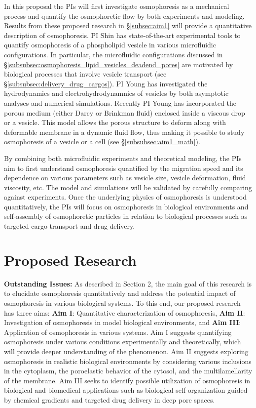 \documentclass[11pt]{article}
\begin{document}
In this proposal the PIs will first investigate osmophoresis as a
mechanical process and quantify the osmophoretic flow by both
experiments and modeling.  Results from these proposed research in
\S\ref{subsec:aim1} will provide a quantitative description of
osmophoresis.  PI Shin has state-of-the-art experimental tools to
quantify osmophoresis of a phospholipid vesicle in various microfluidic
configurations.  In particular, the microfluidic configurations
discussed in \S\ref{subsubsec:osmophoresis_lipid_vesicles_deadend_pores}
are motivated by biological processes that involve vesicle transport
(see \S\ref{subsubsec:delivery_drug_cargos}).  PI Young has investigated
the hydrodynamics and electrohydrodynamnics of vesicles by both
asymptotic analyses and numerical simulations. Recently PI Young has
incorporated the porous medium (either Darcy or Brinkman fluid) enclosed
inside a viscous drop or a vesicle.  This model allows the porous
structure to deform along with deformable membrane in a dynamic fluid
flow, thus making it possible to study osmophoresis of a vesicle or a
cell (see \S\ref{subsubsec:aim1_math}). 

By combining both microfluidic experiments and theoretical modeling, the
PIs aim to first understand osmophoresis quantified by the migration
speed and its dependence on various parameters such as vesicle size,
vesicle deformation, fluid viscosity, etc. The model and simulations
will be validated by carefully comparing against experiments.  Once the
underlying physics of osmophoresis is understood quantitatively, the PIs
will focus on osmophoresis in biological environments and self-assembly
of osmophoretic particles in relation to biological processes such as
targeted cargo transport and drug delivery.

\section{Proposed Research\label{sec:ProposedResearch}}
\noindent
{\bf Outstanding Issues:}
%
As described in Section 2, the main goal of this research is to
elucidate osmophoresis quantitatively and address the potential impact
of osmophoresis in various biological systems. To this end, our proposed
research has three aims: {\bf Aim I}: Quantitative characterization of
osmophoresis, {\bf Aim II}: Investigation of osmophoresis in model
biological environments, and {\bf Aim III}: Application of osmophoresis
in various systems. Aim I suggests quantifying osmophoresis under
various conditions experimentally and theoretically, which will provide
deeper understanding of the phenomenon. Aim II suggests exploring
osmophoresis in realistic biological environments by considering various
inclusions in the cytoplasm, the poroelastic behavior of the cytosol,
and the multilamellarity of the membrane. Aim III seeks to identify
possible utilization of osmophoresis in biological and biomedical
applications such as biological self-organization guided by chemical
gradients and targeted drug delivery in deep pore spaces.
\end{document}
